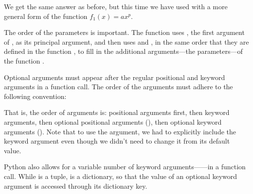 \documentclass[letterpaper,10pt,english]{sphinxmanual}
\begin{document}
\sphinxAtStartPar
We get the same answer as before, but this time we have used  with a more general form of the function \(f_1(x)=ax^p\).

\sphinxAtStartPar
The order of the parameters is important.  The function  uses , the first argument of , as its principal argument, and then uses  and , in the same order that they are defined in the function , to fill in the additional arguments—the parameters—of the function .

\sphinxAtStartPar
Optional arguments must appear after the regular positional and keyword arguments in a function call. The order of the arguments must adhere to the following convention:

\begin{sphinxVerbatim}[commandchars=\\\{\}]
        
\end{sphinxVerbatim}

\sphinxAtStartPar
That is, the order of arguments is: positional arguments first, then keyword arguments, then optional positional arguments (), then optional keyword arguments ().  Note that to use the  argument, we had to explicitly include the keyword argument  even though we didn’t need to change it from its default value.

\sphinxAtStartPar
Python also allows for a variable number of keyword arguments——in a function call.  While  is a tuple,  is a dictionary, so that the value of an optional keyword argument is accessed through its dictionary key.
\end{document}
